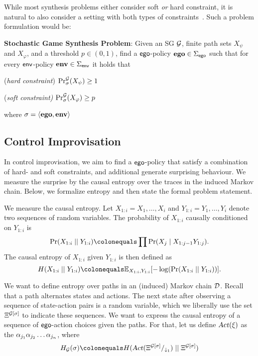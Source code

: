 {{While most synthesis problems either consider soft \emph{or} hard constraint, it is natural to also consider a setting with both types of constraints~\cite{}. Such a problem formulation would be:
\begin{mdframed}{}
\textbf{Stochastic Game Synthesis Problem}:
Given an SG $\mathcal{G}$, finite path sets $X_\psi$ and $X_\varphi$, and a threshold $p \in (0,1)$,  find a $\mathsf{ego}$-policy $\mathbf{ego} \in \Sigma_{\mathsf{ego}}$  such that for every $\mathsf{env}$-policy $\mathbf{env} \in \Sigma_{\mathsf{env}}$ it holds that 
\begin{compactenum}
	\item (\emph{hard constraint}) $\Pr^{\mathcal{G}}_{\sigma}(X_\psi) \geq 1$
	\item (\emph{soft constraint)} $\Pr^{\mathcal{G}}_{\sigma}(X_\varphi) \geq p$
\end{compactenum}
 where $\sigma = \langle \mathbf{ego}, \mathbf{env} \rangle$
\end{mdframed}




\subsection{Control Improvisation}
In control improvisation, we aim to find a $\mathsf{ego}$-policy that satisfy a combination of hard- and soft constraints, and additional generate surprising behaviour. We measure the surprise by the causal entropy over the traces in the induced Markov chain. Below, we formalize entropy and then state the formal problem statement. 

We measure the causal entropy. Let $X_{1:i} = X_1, \hdots, X_i$ and $Y_{1:i} = Y_1,\hdots,Y_i$ denote two sequences of random variables. The probability of $ X_{1:i}$ causally conditioned on $Y_{1:i}$ is 
\[ \causalprob{X_{1:i}}{Y_{1:i}} \colonequals \prod \Pr(X_j \mid X_{1:j-1}Y_{1:j}). \]
The causal entropy of $X_{1:i}$ given $Y_{1:i}$ is then defined as 
\[  H(X_{1:i}\mid\mid Y_{1:i}) \colonequals \expOver{X_{1:i},Y_{1:i}}{-\log(\causalprob{X_{1:i}}{Y_{1:i}})}.\] 

We want to define entropy over paths in an (induced) Markov chain $\mathcal{D}$. Recall that a path alternates states and actions. The next state after observing a sequence of state-action pairs is a random variable, which we liberally use the set $\Xi^{\mathcal{G}[\sigma]}_{}$ to indicate these sequences.  We want to express the causal entropy of a sequence of $\mathsf{ego}$-action choices given the paths. For that, let us define $\textsl{Act}(\xi)$ as the $\alpha_{j_1} \alpha_{j_2} \hdots \alpha_{j_n}$, where 
\[ H_\sg(\sigma) \colonequals H( \textsl{Act}(\POnePaths{\sg[\sched]})   \mid\mid \Paths{\sg[\sched]} )  \]


}}
